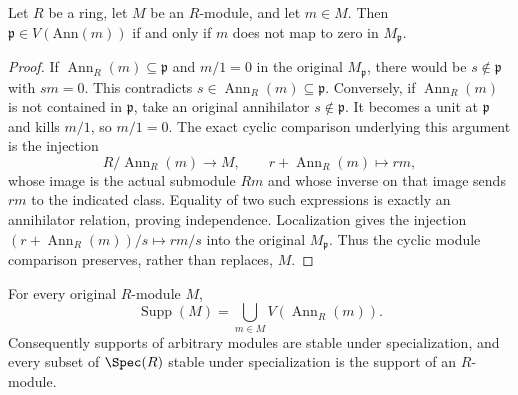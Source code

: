 \begin{lemma}
\label{lemma-support-element}
Let $R$ be a ring, let $M$ be an $R$-module, and let $m \in M$.
Then $\mathfrak p \in V(\text{Ann}(m))$ if and only if
$m$ does not map to zero in $M_\mathfrak p$.
\end{lemma}

\begin{proof}
If $\operatorname{Ann}_R(m)\subseteq\mathfrak p$ and
$m/1=0$ in the original $M_{\mathfrak p}$, there would
be $s\notin\mathfrak p$ with $sm=0$. This contradicts
$s\in\operatorname{Ann}_R(m)\subseteq\mathfrak p$.
Conversely, if $\operatorname{Ann}_R(m)$ is not contained
in $\mathfrak p$, take an original annihilator
$s\notin\mathfrak p$. It becomes a unit at $\mathfrak p$
and kills $m/1$, so $m/1=0$.
The exact cyclic comparison underlying this argument is
the injection
$$
R/\operatorname{Ann}_R(m)\longrightarrow M,\qquad
r+\operatorname{Ann}_R(m)\longmapsto rm,
$$
whose image is the actual submodule $Rm$ and whose
inverse on that image sends $rm$ to the indicated class.
Equality of two such expressions is exactly an
annihilator relation, proving independence. Localization
gives the injection $(r+\operatorname{Ann}_R(m))/s\mapsto rm/s$
into the original $M_{\mathfrak p}$. Thus the cyclic
module comparison preserves, rather than replaces, $M$.
\end{proof}

\begin{lemma}
\label{lemma-support-arbitrary-cyclic-union}
For every original $R$-module $M$,
$$
\operatorname{Supp}(M)=\bigcup_{m\in M}V(\operatorname{Ann}_R(m)).
$$
Consequently supports of arbitrary modules are stable
under specialization, and every subset of $\Spec(R)$
stable under specialization is the support of an $R$-module.
\end{lemma}


